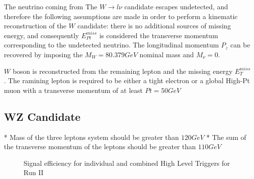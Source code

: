 The neutrino coming from The $W \rightarrow l\nu$ candidate escapes undetected,
and therefore the following assumptions are made in order to perform a kinematic
reconstruction of the $W$ candidate: there is no additional sources of missing
energy, and consequently $E_{Pt}^{miss}$ is considered the transverse momentum
corresponding to the undetected neutrino. The longitudinal momentum $P_z$ can be
recovered by imposing the $M_W = 80.379 GeV $ nominal mass and $M_\nu = 0.$

$W$ boson is reconstructed from the remaining lepton
and the missing energy $E_T^{miss}$. The ramining lepton is required to be either
a tight electron or a global High-Pt muon with a transverse momentum of at least
$Pt=50GeV$


\subsection{WZ Candidate}

* Mass of the three leptons system should be greater than $120GeV$
* The sum of the transverse momentum of the leptons should be greater than $110GeV$









\begin{figure}[tph]
  \centering
  \caption{Signal efficiency for individual and combined High Level Triggers for Run II}
  \label{fig:hltSignalEfficiency}
\end{figure}

